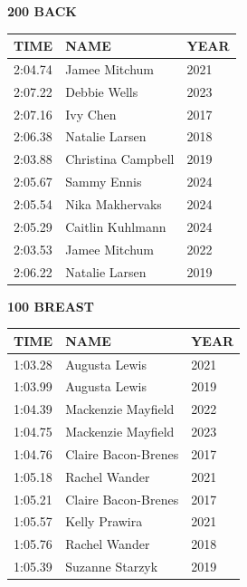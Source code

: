\begin{table}[H]
\centering
\begin{minipage}[t]{0.48\textwidth}
\centering
\textbf{200 BACK}\\[0.1cm]
\begin{tabular}{@{}p{1.8cm}p{2.8cm}p{1.2cm}@{}}
\hline
    \textbf{TIME} & \textbf{NAME} & \textbf{YEAR} \\
\hline
    2:04.74 & Jamee Mitchum & 2021 \\
    2:07.22 & Debbie Wells & 2023 \\
    2:07.16 & Ivy Chen & 2017 \\
    2:06.38 & Natalie Larsen & 2018 \\
    2:03.88 & Christina Campbell & 2019 \\
    2:05.67 & Sammy Ennis & 2024 \\
    2:05.54 & Nika Makhervaks & 2024 \\
    2:05.29 & Caitlin Kuhlmann & 2024 \\
    2:03.53 & Jamee Mitchum & 2022 \\
    2:06.22 & Natalie Larsen & 2019 \\
\hline
\end{tabular}
\end{minipage}\hfill
\begin{minipage}[t]{0.48\textwidth}
\centering
\textbf{100 BREAST}\\[0.1cm]
\begin{tabular}{@{}p{1.8cm}p{2.8cm}p{1.2cm}@{}}
\hline
    \textbf{TIME} & \textbf{NAME} & \textbf{YEAR} \\
\hline
    1:03.28 & Augusta Lewis & 2021 \\
    1:03.99 & Augusta Lewis & 2019 \\
    1:04.39 & Mackenzie Mayfield & 2022 \\
    1:04.75 & Mackenzie Mayfield & 2023 \\
    1:04.76 & Claire Bacon-Brenes & 2017 \\
    1:05.18 & Rachel Wander & 2021 \\
    1:05.21 & Claire Bacon-Brenes & 2017 \\
    1:05.57 & Kelly Prawira & 2021 \\
    1:05.76 & Rachel Wander & 2018 \\
    1:05.39 & Suzanne Starzyk & 2019 \\
\hline
\end{tabular}
\end{minipage}
\end{table}

